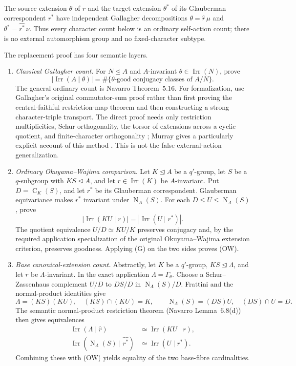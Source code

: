 \documentclass[11pt]{article}
\newcommand{\Irr}{\operatorname{Irr}}
\newcommand{\Norm}{\operatorname{N}}
\newcommand{\Cent}{\operatorname{C}}
\begin{document}
The source extension \(\theta\) of \(r\) and the target extension
\(\theta^*\) of its Glauberman correspondent \(r^*\) have independent
Gallagher decompositions
\(\theta=\widehat r\,\mu\) and
\(\theta^*=\widehat{r^*}\,\nu\).
Thus every character count below is an ordinary self-action count; there
is no external automorphism group and no fixed-character subtype.

The replacement proof has four semantic layers.

\begin{enumerate}[label=\textbf{O\arabic*.},leftmargin=*]
  \item \emph{Classical Gallagher count.}
  For \(N\trianglelefteq A\) and \(A\)-invariant
  \(\theta\in\Irr(N)\), prove
  \[
    |\Irr(A\mid\theta)|
      =\#\{\text{\(\theta\)-good conjugacy classes of \(A/N\)}\}.
    \tag{G}
  \]
  The general ordinary count is Navarro Theorem~5.16.  For formalization,
  use Gallagher's original commutator-sum proof rather than first proving
  the central-faithful restriction-map theorem and then constructing a
  strong character-triple transport.  The direct proof needs only
  restriction multiplicities, Schur orthogonality, the torsor of extensions
  across a cyclic quotient, and finite-character orthogonality
  \cite{Gallagher1971}; Murray gives a particularly explicit account of
  this method \cite[\S2]{Murray2023}.  This is not the false external-action
  generalization.

  \item \emph{Ordinary Okuyama--Wajima comparison.}
  Let \(K\trianglelefteq A\) be a \(q'\)-group, let \(S\) be a
  \(q\)-subgroup with \(KS\trianglelefteq A\), and let
  \(r\in\Irr(K)\) be \(A\)-invariant.  Put \(D=\Cent_K(S)\), and let
  \(r^*\) be its Glauberman correspondent.  Glauberman equivariance makes
  \(r^*\) invariant under \(\Norm_A(S)\).  For each
  \(D\leq U\leq\Norm_A(S)\), prove
  \[
    |\Irr(KU\mid r)|=|\Irr(U\mid r^*)|.
    \tag{OW}
  \]
  The quotient equivalence \(U/D\simeq KU/K\) preserves conjugacy and,
  by the required application specialization of the original
  Okuyama--Wajima extension criterion, preserves goodness.
  Applying (G) on the two sides proves (OW).

  \item \emph{Base canonical-extension count.}
  Abstractly, let \(K\) be a \(q'\)-group,
  \(KS\trianglelefteq\Lambda\), and let \(r\) be
  \(\Lambda\)-invariant.  In the exact application
  \(\Lambda=\Gamma_\theta\).  Choose a Schur--Zassenhaus complement
  \(U/D\) to \(DS/D\) in \(\Norm_\Lambda(S)/D\).  Frattini and the
  normal-product
  identities give
  \[
  \Lambda=(KS)(KU),\quad (KS)\cap(KU)=K,\qquad
  \Norm_\Lambda(S)=(DS)U,\quad (DS)\cap U=D.
  \]
  The semantic normal-product restriction theorem (Navarro
  Lemma~6.8(d)) then gives equivalences
  \[
  \begin{aligned}
    \Irr(\Lambda\mid\widehat r)&\simeq\Irr(KU\mid r),\\
    \Irr(\Norm_\Lambda(S)\mid\widehat{r^*})
      &\simeq\Irr(U\mid r^*).
  \end{aligned}
  \]
  Combining these with (OW) yields equality of the two base-fibre
  cardinalities.


\end{enumerate}
\end{document}
